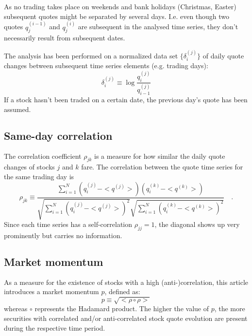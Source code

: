 \documentclass[
10pt, %
a4paper, %
oneside, %
headinclude,footinclude, %
BCOR5mm, %
]{scrartcl}
\numberwithin{equation}{subsection}
\begin{document}
As no trading takes place on weekends and bank holidays (Christmas, Easter) subsequent quotes might be separated by several days. I.e. even though two quotes $q_j^{(i-1)}$ and $q_j^{(i)}$ are subsequent in the analysed time series, they don't necessarily result from subsequent dates.

The analysis has been performed on a normalized data set $\{\delta_i^{(j)}\}$ of daily quote changes between subsequent time series elements (e.g. trading days):
\begin{equation}
\delta_i^{(j)} \equiv \log{\frac{q_{i}^{(j)}}{q_{i-1}^{(j)}}}
\end{equation}
If a stock hasn't been traded on a certain date, the previous day's quote has been assumed.
\subsection{Same-day correlation}
The correlation coefficient $\rho_{jk}$ is a measure for how similar the daily quote changes of stocks $j$ and $k$ fare.
The correlation between the quote time series for the same trading day is
\begin{equation}
\rho_{jk} \equiv \frac{\sum_{i=1}^N\left(q_i^{(j)}-<q^{(j)}>\right)\left(q_i^{(k)}-<q^{(k)}>\right)}{\sqrt{\sum_{i=1}^N\left(q_i^{(j)}-<q^{(j)}>\right)^2}\sqrt{\sum_{i=1}^N\left(q_i^{(k)}-<q^{(k)}>\right)^2}}\quad.
\label{eqSameDayCorrelation}
\end{equation}
Since each time series has a self-correlation $\rho_{jj}=1$, the diagonal shows up very prominently but carries no information.
\subsection{Market momentum}
As a measure for the existence of stocks with a high (anti-)correlation, this article introduces a market momentum $p$, defined as:
\begin{equation}
p\equiv\sqrt{<\rho\circ \rho>}
\end{equation}
whereas $\circ$  represents the Hadamard product. The higher the value of $p$, the more securities with correlated and/or anti-correlated stock quote evolution are present during the respective time period.
\end{document}
